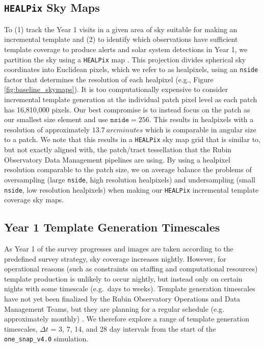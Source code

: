 \documentclass[preprintm,linenumbers]{aastex631}
\newcommand{\baseline}{\texttt{one\_snap\_v4.0}\xspace}
\newcommand{\nside}{\texttt{nside}\xspace}
\newcommand{\healpix}{\texttt{HEALPix}\xspace} %
\begin{document}
	\subsection{\healpix Sky Maps} 
	\label{sec:ITG}
	To (1) track the Year 1 visits in a given area of sky suitable for making an incremental template and (2) to identify which observations have sufficient template coverage to produce alerts and solar system detections in Year 1, we partition the sky using a \healpix map \citep[Hierarchical Equal Area isoLatitude Pixelization\footnote{\url{http://healpix.sourceforge.net}}; ][]{2005ApJ...622..759G}.
    This projection divides spherical sky coordinates into Euclidean pixels, which we refer to as healpixels, using an \verb|nside| factor that determines the resolution of each healpixel (e.g., Figure \ref{fig:baseline_skymaps}). 
 It is too computationally expensive to consider incremental template generation at the individual patch pixel level as each patch has 16,810,000 pixels. 
 Our best compromise is to instead focus on the patch as our smallest size element and use $\texttt{nside}=256$. This results in healpixels with a resolution of approximately $13.7\ \si{arcminutes}$ which is comparable in angular size to a patch. %
	We note that this results in a \healpix sky map grid that is similar to, but not exactly aligned with, the patch/tract tessellation that the Rubin Observatory Data Management pipelines are using.  
 By using a healpixel resolution comparable to the patch size, we on average balance the problems of oversampling (large \nside, high resolution healpixels) and undersampling (small \nside, low resolution healpixels) when making our \healpix incremental template coverage sky maps.
	
	\subsection{Year 1 Template Generation Timescales}
	\label{sec:timescales}
	As Year 1 of the survey progresses and images are taken according to the predefined survey strategy, sky coverage increases nightly. 
 However, for operational reasons (such as constraints on staffing and computational resources)  template production is unlikely to occur nightly, but instead only on certain nights with some timescale (e.g.\ days to weeks). 
 Template generation timescales have not yet been finalized by the Rubin Observatory Operations and Data Management Teams, but they are planning for a regular schedule (e.g. approximately monthly) \citep{DMTN-107,RTN-011}. 
 We therefore explore a range of template generation timescales, $\Delta t$ =  3, 7, 14, and 28 day intervals from the start of the \baseline simulation. 
	
\end{document}
